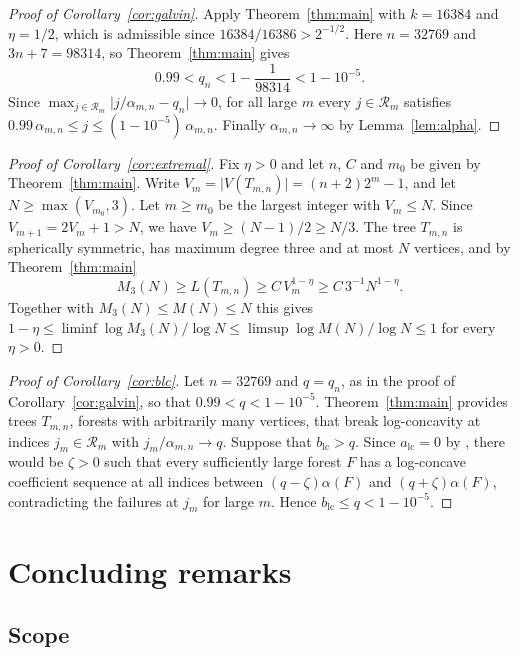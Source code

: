 \documentclass{amsart}
\theoremstyle{definition}
\theoremstyle{remark}
\numberwithin{equation}{section}
\newcommand{\abs}[1]{\lvert #1\rvert}
\begin{document}
\begin{proof}[Proof of Corollary~\ref{cor:galvin}]
Apply Theorem~\ref{thm:main} with $k=16384$ and $\eta=1/2$, which is admissible since $16384/16386>2^{-1/2}$. Here $n=32769$ and $3n+7=98314$, so Theorem~\ref{thm:main} gives
\[
0.99<q_n<1-\frac{1}{98314}<1-10^{-5}.
\]
Since $\max_{j\in\mathcal R_m}\abs{j/\alpha_{m,n}-q_n}\to0$, for all large $m$ every $j\in\mathcal R_m$ satisfies $0.99\,\alpha_{m,n}\le j\le(1-10^{-5})\,\alpha_{m,n}$. Finally $\alpha_{m,n}\to\infty$ by Lemma~\ref{lem:alpha}.
\end{proof}

\begin{proof}[Proof of Corollary~\ref{cor:extremal}]
Fix $\eta>0$ and let $n$, $C$ and $m_0$ be given by Theorem~\ref{thm:main}. Write $V_m=\abs{V(T_{m,n})}=(n+2)2^m-1$, and let $N\ge\max(V_{m_0},3)$. Let $m\ge m_0$ be the largest integer with $V_m\le N$. Since $V_{m+1}=2V_m+1>N$, we have $V_m\ge(N-1)/2\ge N/3$. The tree $T_{m,n}$ is spherically symmetric, has maximum degree three and at most $N$ vertices, and by Theorem~\ref{thm:main}
\[
M_3(N)\ge L(T_{m,n})\ge C\,V_m^{1-\eta}\ge C\,3^{-1}N^{1-\eta}.
\]
Together with $M_3(N)\le M(N)\le N$ this gives $1-\eta\le\liminf\log M_3(N)/\log N\le\limsup\log M(N)/\log N\le1$ for every $\eta>0$.
\end{proof}

\begin{proof}[Proof of Corollary~\ref{cor:blc}]
Let $n=32769$ and $q=q_n$, as in the proof of Corollary~\ref{cor:galvin}, so that $0.99<q<1-10^{-5}$. Theorem~\ref{thm:main} provides trees $T_{m,n}$, forests with arbitrarily many vertices, that break log-concavity at indices $j_m\in\mathcal R_m$ with $j_m/\alpha_{m,n}\to q$. Suppose that $b_{\mathrm{lc}}>q$. Since $a_{\mathrm{lc}}=0$ by \cite[Section~9]{FLNYZ26}, there would be $\zeta>0$ such that every sufficiently large forest $F$ has a log-concave coefficient sequence at all indices between $(q-\zeta)\alpha(F)$ and $(q+\zeta)\alpha(F)$, contradicting the failures at $j_m$ for large $m$. Hence $b_{\mathrm{lc}}\le q<1-10^{-5}$.
\end{proof}

\section{Concluding remarks}\label{sec:remarks}

\subsection{Scope}
\end{document}
